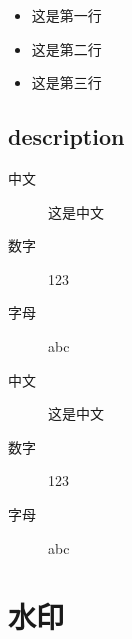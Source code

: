 \begin{itemize}
  \item 这是第一行
  \item 这是第二行
  \item 这是第三行
\end{itemize}

\subsection{description}

\begin{shellbox}
\begin{description}
  \item[中文] 这是中文
  \item[数字] 123
  \item[字母] abc
\end{description}
\end{shellbox}

\begin{description}
  \item[中文] 这是中文
  \item[数字] 123
  \item[字母] abc
\end{description}

\section{水印}

\begin{shellbox}
\usepackage{draftwatermark}
\end{shellbox}
